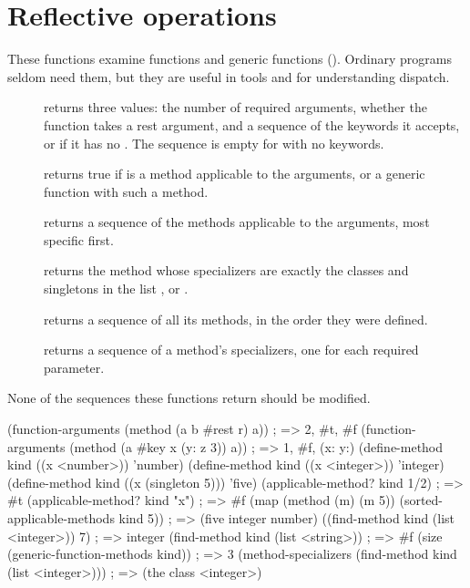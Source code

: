 \section{Reflective operations}\label{sec:functions-reflection}

These functions examine functions and generic functions
(). Ordinary programs seldom need them, but they are
useful in tools and for understanding dispatch.

\begin{description}
\item[]
  returns three values: the number of required arguments, whether the
  function takes a rest argument, and a sequence of the keywords it
  accepts, or  if it has no . The sequence is empty
  for  with no keywords.
\item[]
  returns true if  is a method applicable to the arguments,
  or a generic function with such a method.
\item[]
  returns a sequence of the methods applicable to the arguments, most
  specific first.
\item[]
  returns the method whose specializers are exactly the classes and
  singletons in the list , or .
\item[]
  returns a sequence of all its methods, in the order they were
  defined.
\item[]
  returns a sequence of a method's specializers, one for each required
  parameter.
\end{description}

\noindent None of the sequences these functions return should be modified.

\begin{dylan}
(function-arguments (method (a b #rest r) a))     ; => 2, #t, #f
(function-arguments (method (a #key x (y: z 3)) a)) ; => 1, #f, (x: y:)
(define-method kind ((x <number>)) 'number)
(define-method kind ((x <integer>)) 'integer)
(define-method kind ((x (singleton 5))) 'five)
(applicable-method? kind 1/2)                     ; => #t
(applicable-method? kind "x")                     ; => #f
(map (method (m) (m 5))
     (sorted-applicable-methods kind 5))          ; => (five integer number)
((find-method kind (list <integer>)) 7)           ; => integer
(find-method kind (list <string>))                ; => #f
(size (generic-function-methods kind))            ; => 3
(method-specializers (find-method kind (list <integer>)))
                                                  ; => ({the class <integer>})
\end{dylan}

